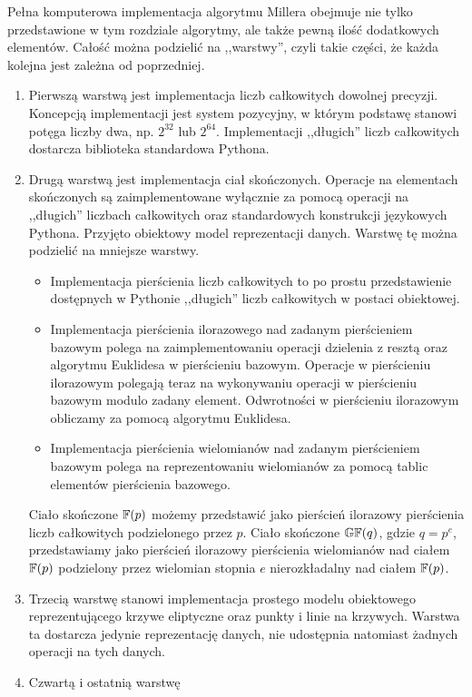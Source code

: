 \noindent
Pełna komputerowa implementacja algorytmu Millera
obejmuje nie tylko przedstawione w tym rozdziale algorytmy,
ale także pewną ilość dodatkowych elementów.
Całość można podzielić na ,,warstwy'',
czyli takie części, że każda kolejna jest zależna od poprzedniej.
\begin{enumerate}
\item
Pierwszą warstwą jest implementacja liczb całkowitych dowolnej precyzji.
Koncepcją implementacji jest system pozycyjny,
w którym podstawę stanowi potęga liczby dwa, np. $2^{32}$ lub $2^{64}$.
Implementacji ,,długich'' liczb całkowitych
dostarcza biblioteka standardowa Pythona.
\item
Drugą warstwą jest implementacja ciał skończonych.
Operacje na elementach skończonych są zaimplementowane
wyłącznie za pomocą operacji na ,,długich'' liczbach całkowitych
oraz standardowych konstrukcji językowych Pythona.
Przyjęto obiektowy model reprezentacji danych.
Warstwę tę można podzielić na mniejsze warstwy.
\begin{itemize}
\item
Implementacja pierścienia liczb całkowitych to po prostu przedstawienie
dostępnych w Pythonie ,,długich'' liczb całkowitych w postaci obiektowej.
\item
Implementacja pierścienia ilorazowego nad zadanym pierścieniem bazowym
polega na zaimplementowaniu
operacji dzielenia z resztą oraz algorytmu Euklidesa w pierścieniu bazowym.
Operacje w pierścieniu ilorazowym polegają teraz
na wykonywaniu operacji w pierścieniu bazowym modulo zadany element.
Odwrotności w pierścieniu ilorazowym obliczamy
za pomocą algorytmu Euklidesa.
\item
Implementacja pierścienia wielomianów nad zadanym pierścieniem bazowym
polega na reprezentowaniu wielomianów
za pomocą tablic elementów pierścienia bazowego.
\end{itemize}
Ciało skończone $\mathbb{F}(p)$
możemy przedstawić jako pierścień ilorazowy
pierścienia liczb całkowitych podzielonego przez $p$.
Ciało skończone $\mathbb{GF}(q)$, gdzie $q = p^e$,
przedstawiamy jako pierścień ilorazowy
pierścienia wielomianów nad ciałem $\mathbb{F}(p)$
podzielony przez wielomian stopnia $e$
nierozkładalny nad ciałem $\mathbb{F}(p)$.
\item
Trzecią warstwę stanowi implementacja prostego modelu obiektowego
reprezentującego krzywe eliptyczne oraz punkty i linie na krzywych.
Warstwa ta dostarcza jedynie reprezentację danych,
nie udostępnia natomiast żadnych operacji na tych danych.
\item
Czwartą i ostatnią warstwę

\end{enumerate}
